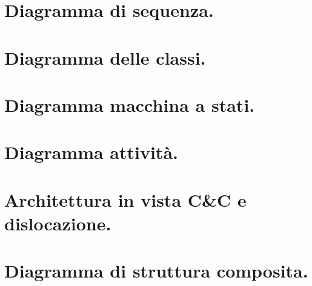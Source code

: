 \documentclass{article}
\begin{document}
\newpage

\section{Diagramma di sequenza.}
\section{Diagramma delle classi.}
\section{Diagramma macchina a stati.}
\section{Diagramma attività.}
\section{Architettura in vista C\&C e dislocazione.}
\section{Diagramma di struttura composita.}
\end{document}
